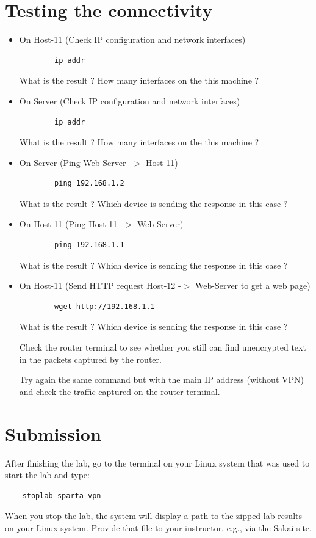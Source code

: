 \section{Testing the connectivity}
\begin{itemize}
	\item On Host-11 (Check IP configuration and network interfaces)
	\begin{verbatim}
	    ip addr
	\end{verbatim}

	What is the result ? How many interfaces on the this machine ?

	\item On Server (Check IP configuration and network interfaces)
	\begin{verbatim}
	    ip addr
	\end{verbatim}

	What is the result ? How many interfaces on the this machine ?

	\item On Server (Ping Web-Server -$>$ Host-11)
	\begin{verbatim}
	    ping 192.168.1.2
	\end{verbatim}

	What is the result ? Which device is sending the response in this case ?

	\item On Host-11 (Ping Host-11 -$>$ Web-Server)
	\begin{verbatim}
	    ping 192.168.1.1
	\end{verbatim}

	What is the result ? Which device is sending the response in this case ?

	\item On Host-11 (Send HTTP request Host-12 -$>$ Web-Server to get a web page)
	\begin{verbatim}
	    wget http://192.168.1.1
	\end{verbatim}

	What is the result ? Which device is sending the response in this case ?

	Check the router terminal to see whether you still can find unencrypted text in the packets captured by the router.

	Try again the same command but with the main IP address (without VPN) and check the traffic captured on the router terminal.

\end{itemize}

\section{Submission}
After finishing the lab, go to the terminal on your Linux system that was used to start the lab and type:
\begin{verbatim}
    stoplab sparta-vpn
\end{verbatim}
When you stop the lab, the system will display a path to the zipped lab results on your Linux system.  Provide that file to
your instructor, e.g., via the Sakai site.


